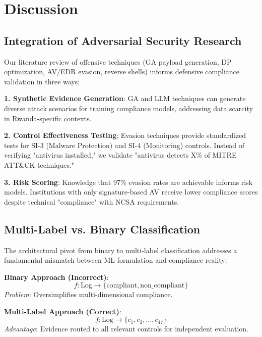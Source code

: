 \documentclass[11pt,conference]{IEEEtran}
\begin{document}
\section{Discussion}

\subsection{Integration of Adversarial Security Research}

Our literature review of offensive techniques (GA payload generation, DP optimization, AV/EDR evasion, reverse shells) informs defensive compliance validation in three ways:

\textbf{1. Synthetic Evidence Generation}:
GA and LLM techniques can generate diverse attack scenarios for training compliance models, addressing data scarcity in Rwanda-specific contexts.

\textbf{2. Control Effectiveness Testing}:
Evasion techniques provide standardized tests for SI-3 (Malware Protection) and SI-4 (Monitoring) controls. Instead of verifying "antivirus installed," we validate "antivirus detects X\% of MITRE ATT\&CK techniques."

\textbf{3. Risk Scoring}:
Knowledge that 97\% evasion rates are achievable \cite{reverse_shell_paper} informs risk models. Institutions with only signature-based AV receive lower compliance scores despite technical "compliance" with NCSA requirements.

\subsection{Multi-Label vs. Binary Classification}

The architectural pivot from binary to multi-label classification addresses a fundamental mismatch between ML formulation and compliance reality:

\textbf{Binary Approach (Incorrect)}:
\begin{equation}
f: \text{Log} \rightarrow \{\text{compliant}, \text{non\_compliant}\}
\end{equation}
\textit{Problem}: Oversimplifies multi-dimensional compliance.

\textbf{Multi-Label Approach (Correct)}:
\begin{equation}
f: \text{Log} \rightarrow \{c_1, c_2, \ldots, c_{47}\}
\end{equation}
\textit{Advantage}: Evidence routed to all relevant controls for independent evaluation.
\end{document}
